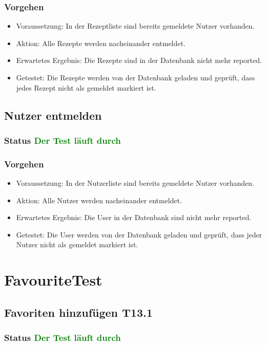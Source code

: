 \subsubsection{Vorgehen}
\begin{itemize}
	\item Voraussetzung: In der Rezeptliste sind bereits gemeldete Nutzer vorhanden.
	\item Aktion: Alle Rezepte werden nacheinander entmeldet.
	\item Erwartetes Ergebnis: Die Rezepte sind in der Datenbank nicht mehr reported.
	\item Getestet: Die Rezepte werden von der Datenbank geladen und geprüft, dass jedes Rezept nicht als gemeldet markiert ist.
\end{itemize}


\subsection{Nutzer entmelden}
\subsubsection{Status \textcolor{green}{ Der Test läuft durch} }
\subsubsection{Vorgehen}
\begin{itemize}
	\item Voraussetzung: In der Nutzerliste sind bereits gemeldete Nutzer vorhanden.
	\item Aktion: Alle Nutzer werden nacheinander entmeldet.
	\item Erwartetes Ergebnis: Die User in der Datenbank sind nicht mehr reported.
	\item Getestet: Die User werden von der Datenbank geladen und geprüft, dass jeder Nutzer nicht als gemeldet markiert ist.
\end{itemize}

\section{FavouriteTest}

\subsection{Favoriten hinzufügen T13.1}
\subsubsection{Status \textcolor{green}{ Der Test läuft durch} }
